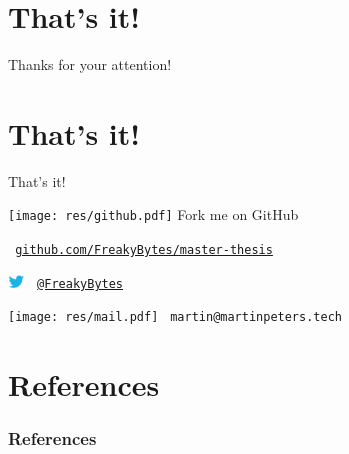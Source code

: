 \section{That's it!}
\label{part:end}

\begin{frame}[c]
	\centering
	\LARGE Thanks for your attention!
		
\end{frame}

\section*{That's it!}
\begin{frame}[c]
	{\LARGE That's it!} %
	
	\texttt{[image: res/github.pdf]}
	\hspace{6.3mm} Fork me on GitHub
	
	{\small \tt
	\hspace{10mm}
	\textcolor{colorscheme}{\href{https://github.com/FreakyBytes/master-thesis}{github.com/FreakyBytes/master-thesis}}\\
	}
	
	\vspace{2.5em}
	
	\includegraphics[height=1em]{res/twitter.png}
	\hspace{3.5mm} \textcolor{colorscheme}{\tt\  \href{https://twitter.com/FreakyBytes}{@FreakyBytes}}
	
	\texttt{[image: res/mail.pdf]}
	\hspace{4.45mm} \textcolor{colorscheme}{\tt\  martin@martinpeters.tech}
		
\end{frame}

\section{References}
\begin{frame}[t,shrink=50]
	\frametitle{References}
	
	\printbibliography
		
	\note{
	}
\end{frame}